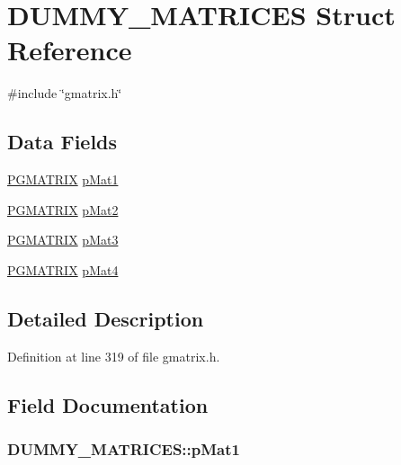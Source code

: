 \hypertarget{structDUMMY__MATRICES}{\section{D\-U\-M\-M\-Y\-\_\-\-M\-A\-T\-R\-I\-C\-E\-S Struct Reference}
\label{structDUMMY__MATRICES}
}


{\ttfamily \#include \char`\"{}gmatrix.\-h\char`\"{}}

\subsection*{Data Fields}
\begin{DoxyCompactItemize}
\item 
\hyperlink{gmatrix_8h_ad8edc274a17feb9e4fca93e620253bed}{P\-G\-M\-A\-T\-R\-I\-X} \hyperlink{structDUMMY__MATRICES_a83b2fec22eaa2674a6360711702d28ac}{p\-Mat1}
\item 
\hyperlink{gmatrix_8h_ad8edc274a17feb9e4fca93e620253bed}{P\-G\-M\-A\-T\-R\-I\-X} \hyperlink{structDUMMY__MATRICES_ada47a9e57f8f5e60971d1d7a888d66b0}{p\-Mat2}
\item 
\hyperlink{gmatrix_8h_ad8edc274a17feb9e4fca93e620253bed}{P\-G\-M\-A\-T\-R\-I\-X} \hyperlink{structDUMMY__MATRICES_ac7b2907eca9bdceb1b78dc5ffb1f8299}{p\-Mat3}
\item 
\hyperlink{gmatrix_8h_ad8edc274a17feb9e4fca93e620253bed}{P\-G\-M\-A\-T\-R\-I\-X} \hyperlink{structDUMMY__MATRICES_a90bf8e9779c6de5e65b4a93341efddba}{p\-Mat4}
\end{DoxyCompactItemize}


\subsection{Detailed Description}


Definition at line 319 of file gmatrix.\-h.



\subsection{Field Documentation}
\hypertarget{structDUMMY__MATRICES_a83b2fec22eaa2674a6360711702d28ac}{
\subsubsection[{p\-Mat1}]{ D\-U\-M\-M\-Y\-\_\-\-M\-A\-T\-R\-I\-C\-E\-S\-::p\-Mat1}}\label{structDUMMY__MATRICES_a83b2fec22eaa2674a6360711702d28ac}


